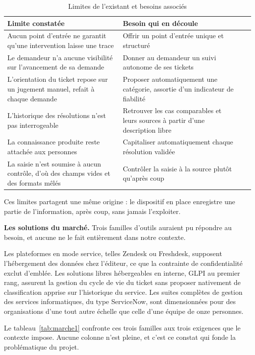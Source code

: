 \begin{table}[!htbp]
\centering
\styletableau
\caption{Limites de l'existant et besoins associés}
\label{tab:limites}
\begin{tabular}{|Bp{6.6cm}|Lp{7.4cm}|}
\hline
{}
\textbf{Limite constatée} & \textbf{Besoin qui en découle} \\
\hline
Aucun point d'entrée ne garantit qu'une intervention laisse une trace &
Offrir un point d'entrée unique et structuré \\
\hline
Le demandeur n'a aucune visibilité sur l'avancement de sa demande &
Donner au demandeur un suivi autonome de ses tickets \\
\hline
L'orientation du ticket repose sur un jugement manuel, refait à chaque demande &
Proposer automatiquement une catégorie, assortie d'un indicateur de fiabilité \\
\hline
L'historique des résolutions n'est pas interrogeable &
Retrouver les cas comparables et leurs sources à partir d'une description libre \\
\hline
La connaissance produite reste attachée aux personnes &
Capitaliser automatiquement chaque résolution validée \\
\hline
La saisie n'est soumise à aucun contrôle, d'où des champs vides et des formats mêlés &
Contrôler la saisie à la source plutôt qu'après coup \\
\hline
\end{tabular}
\end{table}

Ces limites partagent une même origine : le dispositif en place enregistre une partie de
l'information, après coup, sans jamais l'exploiter.

\textbf{Les solutions du marché.} Trois familles d'outils auraient pu répondre au besoin, et aucune ne le fait entièrement dans notre
contexte.

Les plateformes en mode service, telles Zendesk ou Freshdesk, supposent l'hébergement des données
chez l'éditeur, ce que la contrainte de confidentialité exclut d'emblée. Les solutions libres
hébergeables en interne, GLPI au premier rang, assurent la gestion du cycle de vie du ticket sans
proposer nativement de classification apprise sur l'historique du service. Les suites complètes de
gestion des services informatiques, du type ServiceNow, sont dimensionnées pour des organisations
d'une tout autre échelle que celle d'une équipe de onze personnes.

Le tableau~\ref{tab:marche1} confronte ces trois familles aux trois exigences que le contexte
impose. Aucune colonne n'est pleine, et c'est ce constat qui fonde la problématique du projet.

